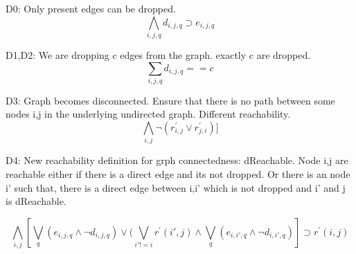 \documentclass{llncs}
\begin{document}
D0: Only present edges can be dropped.
\[ \bigwedge\limits_{i,j,q} d_{i,j,q} \supset e_{i,j,q}  \]

D1,D2: We are dropping c edges from the graph. exactly c are dropped.
\[ \sum_{i,j,q} d_{i,j,q} == c \]

D3:  Graph becomes disconnected. Ensure that there is no path between some nodes i,j in the underlying undirected graph. Different reachability.
\[ \bigwedge\limits_{i,j} \neg (r^{\prime}_{i,j} \lor r^{\prime}_{j,i})]  \]

D4: New reachability definition for grph connectedness: dReachable. Node i,j are reachable either if there is a direct edge and its not dropped. 
Or there is an node i' such that, there is a direct edge between i,i' which is not dropped and i' and j is dReachable.

\[ \bigwedge\limits_{i,j}  [\bigvee_{q} (e_{i,j,q} \land  \neg d_{i,j,q}) \lor  (\bigvee_{i' != i}  r^{\prime}(i',j) \land  \bigvee_{q} (e_{i,i',q} \land \neg d_{i,i',q}) ] \supset r^{\prime}(i,j)  \]
  
\end{document}
